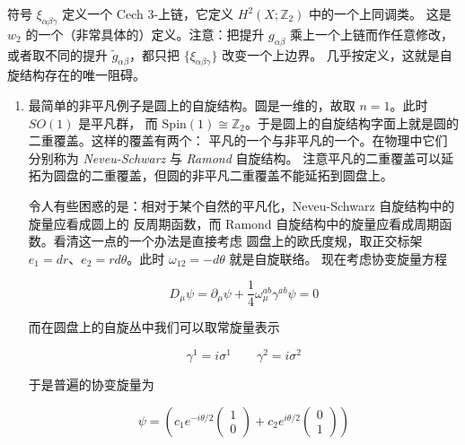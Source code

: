 符号 $\xi_{\alpha\beta\gamma}$ 定义一个 Cech 3-上链，它定义 $H^2(X;\mathbb{Z}_2)$ 中的一个上同调类。
这是 $w_2$ 的一个（非常具体的）定义。注意：把提升 $g_{\alpha\beta}$ 乘上一个上链而作任意修改，
或者取不同的提升 $\tilde{g}_{\alpha\beta}$，都只把 $\{\xi_{\alpha\beta\gamma}\}$ 改变一个上边界。
几乎按定义，这就是自旋结构存在的唯一阻碍。

\begin{enumerate}
  \item 最简单的非平凡例子是圆上的自旋结构。圆是一维的，故取 $n=1$。此时 $SO(1)$ 是平凡群，
    而 $\mathrm{Spin}(1)\cong\mathbb{Z}_2$。于是圆上的自旋结构字面上就是圆的二重覆盖。这样的覆盖有两个：
    平凡的一个与非平凡的一个。在物理中它们分别称为 \emph{Neveu-Schwarz} 与 \emph{Ramond} 自旋结构。
    注意平凡的二重覆盖可以延拓为圆盘的二重覆盖，但圆的非平凡二重覆盖不能延拓到圆盘上。

    令人有些困惑的是：相对于某个自然的平凡化，Neveu-Schwarz 自旋结构中的旋量应看成圆上的
    反周期函数，而 Ramond 自旋结构中的旋量应看成周期函数。看清这一点的一个办法是直接考虑
    圆盘上的欧氏度规，取正交标架 $e_1=dr$、$e_2=rd\theta$。此时 $\omega_{12}=-d\theta$ 就是自旋联络。
    现在考虑协变旋量方程

    \begin{equation}
      D_\mu\psi = \partial_\mu\psi + \frac{1}{4}\omega_\mu^{ab}\gamma^{ab}\psi = 0
      \tag{G.13}
      \label{eq:G.13}
    \end{equation}

    而在圆盘上的自旋丛中我们可以取常旋量表示

    \begin{equation}
      \gamma^1 = i\sigma^1 \qquad \gamma^2 = i\sigma^2
      \tag{G.14}
      \label{eq:G.14}
    \end{equation}

    于是普遍的协变旋量为

    \begin{equation}
      \psi = \left( c_1 e^{-i\theta/2}\begin{pmatrix} 1 \\ 0 \end{pmatrix}
        + c_2 e^{i\theta/2}\begin{pmatrix} 0 \\ 1 \end{pmatrix} \right)
      \tag{G.15}
      \label{eq:G.15}
    \end{equation}



\end{enumerate}
